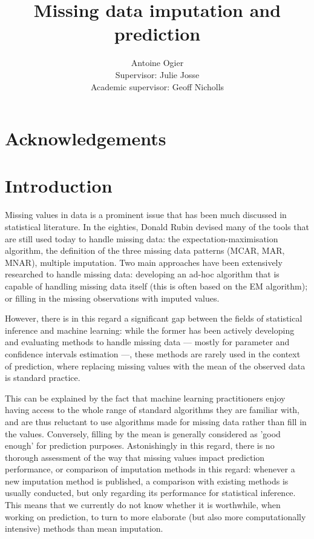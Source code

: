 \documentclass[12pt, a4paper]{article}
\title{Missing data imputation and prediction}
\author{Antoine Ogier \\ Supervisor: Julie Josse \\ Academic supervisor: Geoff Nicholls}
\begin{document}
\maketitle
\thispagestyle{empty}
\tableofcontents
\newpage
{}

\section*{Acknowledgements}
\section*{Introduction}
Missing values in data is a prominent issue that has been much discussed in statistical literature. In the eighties, Donald Rubin devised many of the tools that are still used today to handle missing data: the expectation-maximisation algorithm, the definition of the three missing data patterns (MCAR, MAR, MNAR), multiple imputation. Two main approaches have been extensively researched to handle missing data: developing an ad-hoc algorithm that is capable of handling missing data itself (this is often based on the EM algorithm); or filling in the missing observations with imputed values.

However, there is in this regard a significant gap between the fields of statistical inference and machine learning: while the former has been actively developing and evaluating methods to handle missing data --- mostly for parameter and confidence intervals estimation ---, these methods are rarely used in the context of prediction, where replacing missing values with the mean of the observed data is standard practice.

This can be explained by the fact that machine learning practitioners enjoy having access to the whole range of standard algorithms they are familiar with, and are thus reluctant to use algorithms made for missing data rather than fill in the values. Conversely, filling by the mean is generally considered as 'good enough' for prediction purposes. Astonishingly in this regard, there is no thorough assessment of the way that missing values impact prediction performance, or comparison of imputation methods in this regard: whenever a new imputation method is published, a comparison with existing methods is usually conducted, but only regarding its performance for statistical inference. This means that we currently do not know whether it is worthwhile, when working on prediction, to turn to more elaborate (but also more computationally intensive) methods than mean imputation.
\end{document}
